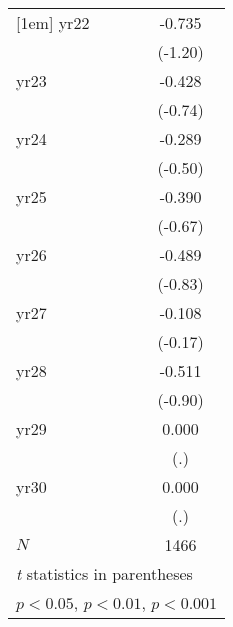 {\begin{tabular}{l*{1}{c}}
[1em]
yr22        &      -0.735         \\
            &     (-1.20)         \\
[1em]
yr23        &      -0.428         \\
            &     (-0.74)         \\
[1em]
yr24        &      -0.289         \\
            &     (-0.50)         \\
[1em]
yr25        &      -0.390         \\
            &     (-0.67)         \\
[1em]
yr26        &      -0.489         \\
            &     (-0.83)         \\
[1em]
yr27        &      -0.108         \\
            &     (-0.17)         \\
[1em]
yr28        &      -0.511         \\
            &     (-0.90)         \\
[1em]
yr29        &       0.000         \\
            &         (.)         \\
[1em]
yr30        &       0.000         \\
            &         (.)         \\
\hline
\(N\)       &        1466         \\
\hline\hline
\multicolumn{2}{l}{\footnotesize \textit{t} statistics in parentheses}\\
\multicolumn{2}{l}{\footnotesize \sym{*} \(p<0.05\), \sym{**} \(p<0.01\), \sym{***} \(p<0.001\)}\\
\end{tabular}
}
